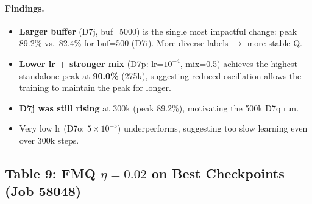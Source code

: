 \documentclass[11pt]{article}
\begin{document}
\paragraph{Findings.}
\begin{itemize}
\item \textbf{Larger buffer} (D7j, buf=5000) is the single most impactful change:
      peak 89.2\% vs.\ 82.4\% for buf=500 (D7i). More diverse labels $\to$ more stable Q.
\item \textbf{Lower lr + stronger mix} (D7p: lr=$10^{-4}$, mix=0.5) achieves the highest
      standalone peak at \textbf{90.0\%} (275k), suggesting reduced oscillation allows the
      training to maintain the peak for longer.
\item \textbf{D7j was still rising} at 300k (peak 89.2\%), motivating the 500k D7q run.
\item Very low lr (D7o: $5\times10^{-5}$) underperforms, suggesting too slow learning
      even over 300k steps.
\end{itemize}

\subsection*{Table 9: FMQ $\eta=0.02$ on Best Checkpoints (Job 58048)}
\end{document}
